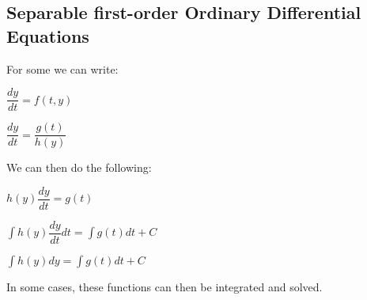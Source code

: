 
\subsection{Separable first-order Ordinary Differential Equations}

For some we can write:

\(\dfrac{dy}{dt}=f(t,y)\)

\(\dfrac{dy}{dt}=\dfrac{g(t)}{h(y)}\)

We can then do the following:

\(h(y)\dfrac{dy}{dt}=g(t)\)

\(\int h(y)\dfrac{dy}{dt}dt=\int g(t)dt + C\)

\(\int h(y)dy=\int g(t)dt + C\)

In some cases, these functions can then be integrated and solved.


